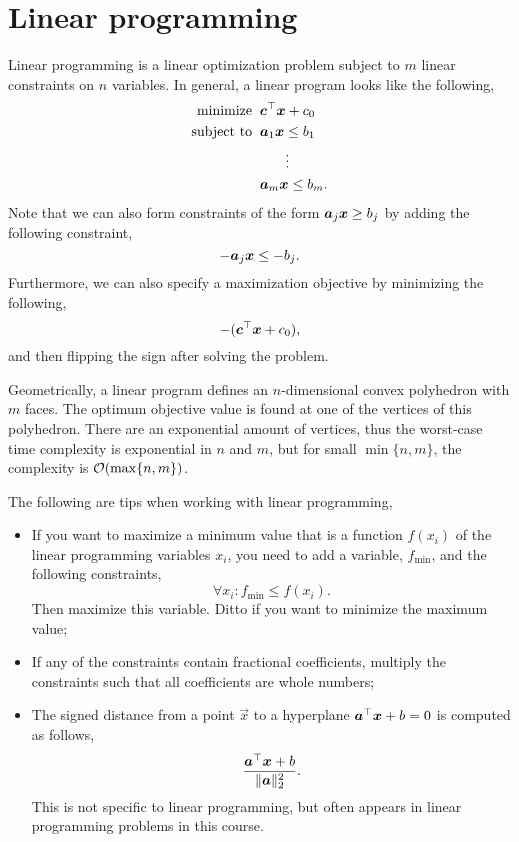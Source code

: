 \documentclass[justified,nobib]{tufte-handout}
\begin{document}
\section{Linear programming}


Linear programming is a linear optimization problem subject to $m$ linear
constraints on $n$ variables. In general, a linear program looks like the following,
\begin{align*}
  \text{minimize} \;\; & \transpose{\vec{c}} \vec{x} + c_0 \\
  \text{subject to} \;\; & \mat{a}_1 \vec{x} \leq b_1 \\
   & \vdotswithin{\mat{a}_1 \vec{x} \leq b_1} \\
  & \mat{a}_m \vec{x} \leq b_m
.\end{align*}
Note that we can also form constraints of the form $\bm{a}_j \bm{x} \geq b_j$
by adding the following constraint, \[
  -\bm{a}_j \bm{x} \leq -b_j
.\]
Furthermore, we can also specify a maximization objective by minimizing the
following, \[
  -(\bm{c}^\top \bm{x} + c_0)
,\]
and then flipping the sign after solving the problem.

Geometrically, a linear program defines an $n$-dimensional convex polyhedron
with $m$ faces. The optimum objective value is found at one of the vertices of
this polyhedron. There are an exponential amount of vertices, thus the
worst-case time complexity is exponential in $n$ and $m$, but for small $\min
\{ n,m \}$, the complexity is $\bigo{\max\{ n,m \}}$.

The following are tips when working with linear programming,
\begin{itemize}
  \item If you want to maximize a minimum value that is a function $f(x_i)$ of
    the linear programming variables $x_i$, you need to add a variable,
    $f_{\min}$, and the following constraints, \[
      \forall x_i : f_{\min} \leq f(x_i)
    .\]
    Then maximize this variable. Ditto if you want to minimize the maximum
    value;

  \item If any of the constraints contain fractional coefficients, multiply the
    constraints such that all coefficients are whole numbers;

  \item The signed distance from a point $\vec{x}$ to a hyperplane
    $\bm{a}^\top\bm{x} + b = 0$ is computed as follows, \[
      \frac{\bm{a}^\top\bm{x} + b}{\lVert \bm{a} \rVert_2^2}
    .\]
    This is not specific to linear programming, but often appears in linear
    programming problems in this course.
\end{itemize}
\end{document}
